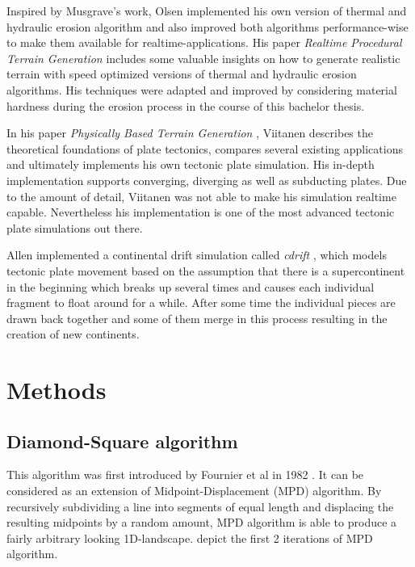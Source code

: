 \documentclass[11pt,a4paper,twoside,openright]{report}
\begin{document}
Inspired by Musgrave's work, Olsen implemented his own version of thermal and hydraulic erosion algorithm and also improved both algorithms performance-wise to make them available for realtime-applications. His paper \emph{Realtime Procedural Terrain Generation} \cite{Olsen:2004} includes some valuable insights on how to generate realistic terrain with speed optimized versions of thermal and hydraulic erosion algorithms. His techniques were adapted and improved by considering material hardness during the erosion process in the course of this bachelor thesis.

In his paper \emph{Physically Based Terrain Generation} \cite{Viitanen:2012}, Viitanen describes the theoretical foundations of plate tectonics, compares several existing applications and ultimately implements his own tectonic plate simulation. His in-depth implementation supports converging, diverging as well as subducting plates. Due to the amount of detail, Viitanen was not able to make his simulation realtime capable. Nevertheless his implementation is one of the most advanced tectonic plate simulations out there.

Allen implemented a continental drift simulation called \emph{cdrift} \cite{Allen:1991}, which models tectonic plate movement based on the assumption that there is a supercontinent in the beginning which breaks up several times and causes each individual fragment to float around for a while. After some time the individual pieces are drawn back together and some of them merge in this process resulting in the creation of new continents.
\chapter{Methods}
\label{sec:methods}

\section{Diamond-Square algorithm}
This algorithm was first introduced by Fournier et al in 1982 \cite{Fournier:1982:CRS:358523.358553}. It can be considered as an extension of Midpoint-Displacement (MPD) algorithm. By recursively subdividing a line into segments of equal length and displacing the resulting midpoints by a random amount, MPD algorithm is able to produce a fairly arbitrary looking 1D-landscape.  depict the first 2 iterations of MPD algorithm.
\end{document}
